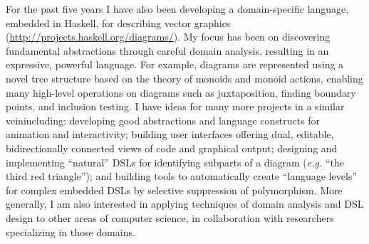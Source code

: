 \begin{letter}{\thereaddress}
{For the past five years I have also been developing a domain-specific
language, embedded in Haskell, for describing vector graphics
(\url{http://projects.haskell.org/diagrams/}).  My focus has been on
discovering fundamental abstractions through careful domain analysis,
resulting in an expressive, powerful language. For example, diagrams
are represented using a novel tree structure based on the theory of
monoids and monoid actions, enabling many high-level operations on
diagrams such as juxtaposition, finding boundary points, and inclusion
testing.  I have ideas for many more projects in a similar
veinincluding: developing good abstractions and
language constructs for animation and interactivity; building user
interfaces offering dual, editable, bidirectionally connected views of
code and graphical output; designing and implementing ``natural'' DSLs
for identifying subparts of a diagram (\emph{e.g.} ``the third red
triangle''); and building tools to automatically create ``language
levels'' for complex embedded DSLs by selective suppression of
polymorphism.  More generally, I am also interested in applying
techniques of domain analysis and DSL design to other areas of
computer science, in collaboration with researchers specializing in
those domains.

} %
{}

\end{letter}
